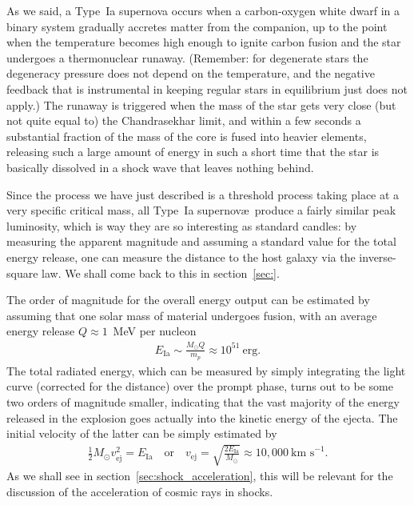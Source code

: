 As we said, a Type~Ia supernova occurs when a carbon-oxygen white dwarf in a binary system
gradually accretes matter from the companion, up to the point when the temperature
becomes high enough to ignite carbon fusion and the star undergoes a thermonuclear
runaway. (Remember: for degenerate stars the degeneracy pressure does not depend
on the temperature, and the negative feedback that is instrumental in keeping regular
stars in equilibrium just does not apply.) The runaway is triggered when the mass
of the star gets very close (but not quite equal to) the Chandrasekhar limit, and
within a few seconds a substantial fraction of the mass of the core is fused into
heavier elements, releasing such a large amount of energy in such a short time that
the star is basically dissolved in a shock wave that leaves nothing behind.

Since the process we have just described is a threshold process taking place at a very
specific critical mass, all Type~Ia supernov\ae\ produce a fairly similar peak luminosity,
which is way they are so interesting as standard candles: by measuring the apparent
magnitude and assuming a standard value for the total energy release,
one can measure the distance to the host galaxy via the inverse-square law.
We shall come back to this in section~\ref{sec:}.

The order of magnitude for the overall energy output can be estimated by assuming
that one solar mass of material undergoes fusion, with an average energy release
$Q \approx 1$~MeV per nucleon
\begin{align}
	E_\text{Ia} \sim \frac{M_\odot Q}{m_p} \approx 10^{51}~\text{erg}.
\end{align}
The total radiated energy, which can be measured by simply integrating the light curve
(corrected for the distance) over the prompt phase, turns out to be some two orders
of magnitude smaller, indicating that the vast majority of the energy released in the
explosion goes actually into the kinetic energy of the ejecta. The initial velocity of the latter
can be simply estimated by
\begin{align}
  \frac{1}{2} M_\odot v_\text{ej}^2 = E_\text{Ia}
  \quad\text{or}\quad
  v_\text{ej} = \sqrt{\frac{2 E_\text{Ia}}{M_\odot}} \approx 10,000~\text{km~s}^{-1}.
\end{align}
As we shall see in section~\ref{sec:shock_acceleration}, this will be relevant for the discussion of
the acceleration of cosmic rays in shocks.


